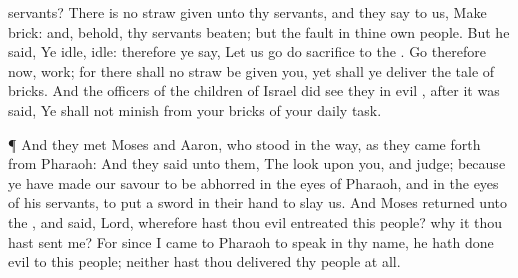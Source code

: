 {servants?
There is no
straw
given unto thy
servants, and they
say to us,
Make
brick: and, behold, thy
servants
{}
beaten; but the
fault
{} in thine own
people.
But he
said, Ye
{}
idle,
{}
idle: therefore ye
say, Let us
go
{} do
sacrifice to the
{}.
Go therefore now,
{}
work; for there shall no
straw be
given you, yet shall ye
deliver the
tale of
bricks.
And the
officers of the
children of
Israel did
see
{} they
{} in
evil
{}, after it was
said, Ye shall not
minish
{} from your
bricks of your
daily
task.
\par }{\PP {}¶ And they
met
Moses and
Aaron, who
stood in the
way, as they came
forth from
Pharaoh:
And they
said unto them, The
{}
look upon you, and
judge; because ye have made our
savour to be
abhorred in the
eyes of
Pharaoh, and in the
eyes of his
servants, to
put a
sword in their
hand to
slay us.
And
Moses
returned unto the
{}, and
said,
Lord, wherefore hast thou
{} evil
entreated this
people? why
{} it
{} thou hast
sent me?
For since I
came to
Pharaoh to
speak in thy
name, he hath done
evil to this
people; neither hast thou
delivered thy
people at
all.

}
